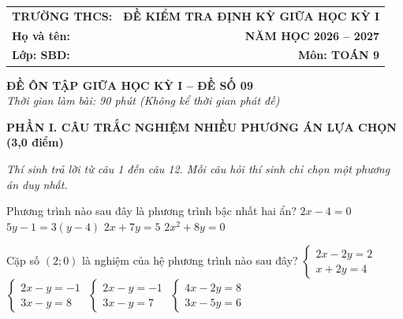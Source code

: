 \documentclass[12pt,a4paper]{article}
\begin{document}
\noindent
\begin{tabularx}{\linewidth}{X r}
\textbf{TRƯỜNG THCS: \dotfill} & \textbf{ĐỀ KIỂM TRA ĐỊNH KỲ GIỮA HỌC KỲ I} \\
\textbf{Họ và tên: \dotfill} & \textbf{NĂM HỌC 2026 -- 2027} \\
\textbf{Lớp: \dotfill \quad SBD: \dotfill} & \textbf{Môn: TOÁN 9} \\
\hline
\end{tabularx}
\vspace{2mm}

\begin{center}
  \textbf{\large ĐỀ ÔN TẬP GIỮA HỌC KỲ I -- ĐỀ SỐ 09}\\
  \textit{Thời gian làm bài: 90 phút (Không kể thời gian phát đề)}
\end{center}
\vspace{1mm}

\noindent\textbf{\large PHẦN I. CÂU TRẮC NGHIỆM NHIỀU PHƯƠNG ÁN LỰA CHỌN (3,0 điểm)}

\textit{Thí sinh trả lời từ câu 1 đến câu 12. Mỗi câu hỏi thí sinh chỉ chọn một phương án duy nhất.}

\vspace{1mm}
\begin{ex}
Phương trình nào sau đây là phương trình bậc nhất hai ẩn?
\choice
{$2x - 4 = 0$}
{$5y - 1 = 3(y - 4)$}
{\True $2x + 7y = 5$}
{$2x^2 + 8y = 0$}
\end{ex}

\begin{ex}
Cặp số $(2; 0)$ là nghiệm của hệ phương trình nào sau đây?
\choice
{$\begin{cases} 2x - 2y = 2 \\ x + 2y = 4 \end{cases}$}
{$\begin{cases} 2x - y = -1 \\ 3x - y = 8 \end{cases}$}
{$\begin{cases} 2x - y = -1 \\ 3x - y = 7 \end{cases}$}
{\True $\begin{cases} 4x - 2y = 8 \\ 3x - 5y = 6 \end{cases}$}
\end{ex}
\end{document}
